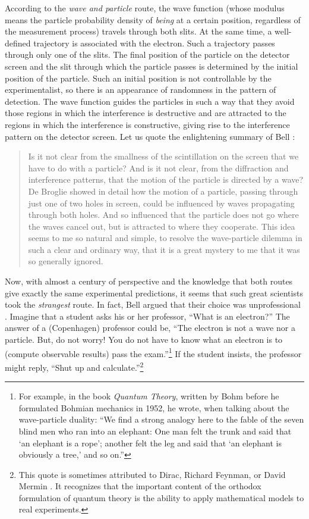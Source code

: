 \documentclass[onecolumn,nofootinbib, secnumarabic, amsmath, nobibnotes,12pt,aps,pra]{revtex4-1}
\begin{document}
According to the \textit{wave and particle} route, the wave function (whose modulus means the particle probability density of \textit{being} at a certain position, regardless of the measurement process) travels through both slits. At the same time, a well-defined trajectory is associated with the electron. Such a trajectory passes through only one of the slits. The final position of the particle on the detector screen and the slit through which the particle passes is determined by the initial position of the particle. Such an initial position is not controllable by the experimentalist, so there is an appearance of randomness in the pattern of detection. The wave function guides the particles in such a way that they avoid those regions in which the interference is destructive and are attracted to the regions in which the interference is constructive, giving rise to the interference pattern on the detector screen. Let us quote the enlightening summary of Bell \cite{om.Bell1987}:

\begin{quote}
Is it not clear from the smallness of the scintillation on the screen that we have to do with a particle? And is it not clear, from the diffraction and interference patterns, that the motion of the particle is directed by a wave? De Broglie showed in detail how the motion of a particle, passing through just one of two holes in screen, could be influenced by waves propagating through both holes. And so influenced that the particle does not go where the waves cancel out, but is attracted to where they cooperate. This idea seems to me so natural and simple, to resolve the wave-particle dilemma in such a clear and ordinary way, that it is a great mystery to me that it was so generally ignored.
\end{quote}

Now, with almost a century of perspective and the knowledge that both routes give exactly the same experimental predictions, it seems that such great scientists took the \textit{strangest} route. In fact, Bell argued that their choice was unprofessional \cite{om.Bell1987}. Imagine that a student asks his or her professor, ``What is an electron?'' The answer of a (Copenhagen) professor could be, ``The electron is not a wave nor a particle. But, do not worry! You do not have to know what an electron is to (compute observable results) pass the exam.''\footnote{For example, in the book \textit{Quantum Theory}, \cite{om.bohmbook} written by Bohm before he formulated Bohmian mechanics in 1952, he wrote, when talking about the wave-particle duality: ``We find a strong analogy here to the fable of the seven blind men who ran into an elephant: One man felt the trunk and said that `an elephant is a rope'; another felt the leg and said that `an elephant is obviously a tree,' and so on.''} If the student insists, the professor might reply, ``Shut up and calculate.''\footnote{This quote is sometimes attributed to Dirac, Richard Feynman, or David Mermin \cite{om.mermin,om.mermin2}. It recognizes that the important content of the orthodox formulation of quantum theory is the ability to apply mathematical models to real experiments.}
\end{document}
